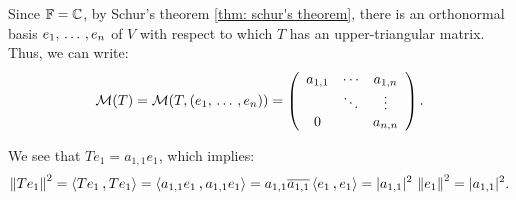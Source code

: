 \begin{prf}
  Since $\mathbb{F}=\mathbb{C}$, by Schur's theorem \ref{thm: schur's theorem}, there is an orthonormal basis $e_1, {\, \ldots \,\,}, e_n$ of $V$ with respect to which $T$ has an upper-triangular matrix. Thus, we can write:
  \begin{equation}
    \label{eq: mmatrix T, e1...en}
    \mathcal{M}(T) = \mathcal{M} (T, (e_1, {\, \ldots \,\,}, e_n)) =
    \left(
    \begin{array}{ccc}
      a_{1,1} & \cdots & a_{1,n} \\
      & \ddots & \vdots \\
      0     &        & a_{n,n} \\
    \end{array}
    \right).
  \end{equation}

  We see that $T e_1 = a_{1,1} e_1$, which implies:
  \[
  \norm{T e_1}^2 = \ip{Te_1}{Te_1}
  = \ip{a_{1,1} e_1}{a_{1,1} e_1}
  = a_{1,1} \overline{a_{1,1}} \ip{e_1}{e_1}
  = |a_{1,1}|^2 \, \norm{e_1}^2 = |a_{1,1}|^2.
  \]


\end{prf}
